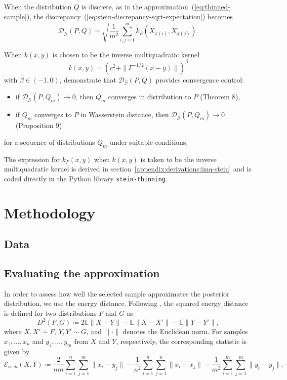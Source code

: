 \documentclass[12pt,a4paper]{report}
\begin{document}
When the distribution $Q$ is discrete, as in the approximation~(\ref{eq:thinned-sample}), the discrepancy~(\ref{eq:stein-discrepancy-sqrt-expectation}) becomes
\begin{equation}
\mathcal{D}_{\mathcal{G}}(P, Q) = \sqrt{\frac{1}{m^2} \sum_{i,j=1}^m k_P(X_{\pi(i)}, X_{\pi(j)})}.
\end{equation}

When $k(x, y)$ is chosen to be the inverse multiquadratic kernel
\begin{equation}
k(x, y) = \left(c^2 + \|\Gamma^{-1/2}(x-y)\|\right)^\beta
\label{eq:imq}
\end{equation}
with $\beta \in (-1, 0)$, \cite{gorhamMeasuringSampleQuality2017} demonstrate that $\mathcal{D}_{\mathcal{G}}(P, Q)$ provides convergence control:
\begin{itemize}
\item if $\mathcal{D}_{\mathcal{G}}(P, Q_m) \to 0$, then $Q_m$ converges in distribution to $P$ (Theorem 8),
\item if $Q_m$ converges to $P$ in Wasserstein distance, then $\mathcal{D}_{\mathcal{G}}(P, Q_m) \to 0$ (Proposition 9)
\end{itemize}
for a sequence of distributions $Q_m$ under suitable conditions.


The expression for $k_P(x, y)$ when $k(x, y)$ is taken to be the inverse multiquadratic kernel is derived in section~\ref{appendix:derivations:imq-stein} and is coded directly in the Python library \texttt{stein-thinning}.

\chapter{Methodology}

\section{Data}

\section{Evaluating the approximation}

In order to assess how well the selected sample approximates the posterior distribution, we use the energy distance. Following \cite{rizzoEnergyDistance2016}, the squared energy distance is defined for two distributions $F$ and $G$ as
$$D^2(F, G) \coloneq 2 \mathbb{E} \|X - Y\| - \mathbb{E}\|X - X'\| - \mathbb{E} \|Y - Y'\|,$$
where $X, X' \sim F$, $Y, Y' \sim G$, and $\|\cdot\|$ denotes the Euclidean norm. For samples $x_1, \dots, x_n$ and $y_1, \dots, y_m$ from $X$ and $Y$, respectively, the corresponding statistic is given by
$$\mathcal{E}_{n,m}(X, Y) \coloneq \frac{2}{nm}\sum_{i=1}^n \sum_{j=1}^m \|x_i - y_j\| - \frac{1}{n^2} \sum_{i=1}^n\sum_{j=1}^n \|x_i - x_j\| - \frac{1}{m^2} \sum_{i=1}^m \sum_{j=1}^m \|y_i - y_j\|.$$
\end{document}
